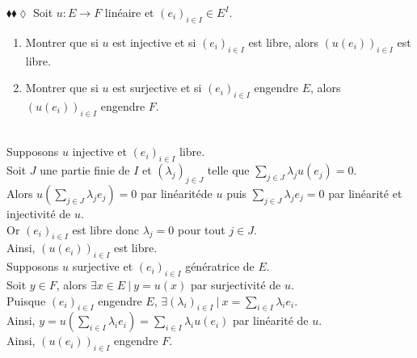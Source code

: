 \documentclass[11pt]{article}
\begin{document}
\begin{exercise}{$\blacklozenge\blacklozenge\lozenge$}{}
    Soit $u:E\to F$ linéaire et $(e_i)_{i\in I} \in E^I$.
    \begin{enumerate}[topsep=0pt,itemsep=-0.9ex]
        \item Montrer que si $u$ est injective et si $(e_i)_{i\in I}$ est libre, alors $(u(e_i))_{i\in I}$ est libre.
        \item Montrer que si $u$ est surjective et si $(e_i)_{i\in I}$ engendre $E$, alors $(u(e_i))_{i\in I}$ engendre $F$.
    \end{enumerate}
    \tcblower\\[0.2cm]
     Supposons $u$ injective et $(e_i)_{i\in I}$ libre.\\
    Soit $J$ une partie finie de $I$ et $(\lambda_j)_{j\in J}$ telle que $\sum_{j\in J} \lambda_ju(e_j) = 0$.\\
    Alors $u\left(\sum_{j\in J} \lambda_je_j\right) = 0$ par linéaritéde $u$ puis $\sum_{j\in J}\lambda_j e_j = 0$ par linéarité et injectivité de $u$.\\
    Or $(e_i)_{i\in I}$ est libre donc $\lambda_j = 0$ pour tout $j\in J$.\\
    Ainsi, $(u(e_i))_{i\in I}$ est libre.\\[0.3cm]
     Supposons $u$ surjective et $(e_i)_{i\in I}$ génératrice de $E$.\\
    Soit $y\in F$, alors $\exists x\in E ~ | ~ y = u(x)$ par surjectivité de $u$.\\
    Puisque $(e_i)_{i\in I}$ engendre $E$, $\exists (\lambda_i)_{i\in I} ~ | ~ x = \sum_{i\in I}\lambda_ie_i$.\\
    Ainsi, $y = u\left(\sum_{i\in I}\lambda_ie_i\right) = \sum_{i\in I}\lambda_iu(e_i)$ par linéarité de $u$.\\
    Ainsi, $(u(e_i))_{i\in I}$ engendre $F$.
\end{exercise}
\end{document}
